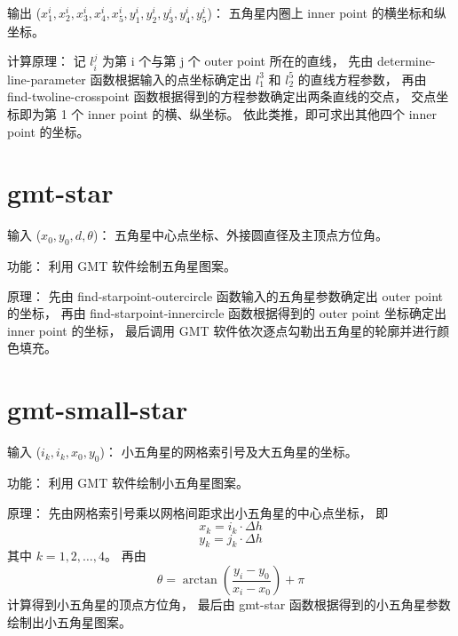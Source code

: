 \documentclass[UTF8]{ctexart}
\begin{document}
输出 ($x_1^i, x_2^i, x_3^i, x_4^i, x_5^i,
y_1^i, y_2^i, y_3^i, y_4^i, y_5^i$)：
五角星内圈上 inner point 的横坐标和纵坐标。

计算原理：
记 $l_i^j$ 为第 i 个与第 j 个 outer point 所在的直线，
先由 determine-line-parameter 函数根据输入的点坐标确定出 $l_1^3$ 和 $l_2^5$ 的直线方程参数，
再由 find-twoline-crosspoint 函数根据得到的方程参数确定出两条直线的交点，
交点坐标即为第 1 个 inner point 的横、纵坐标。
依此类推，即可求出其他四个 inner point 的坐标。

\section{gmt-star}
输入 ($x_0, y_0, d, \theta$)：
五角星中心点坐标、外接圆直径及主顶点方位角。

功能：
利用 GMT 软件绘制五角星图案。

原理：
先由 find-starpoint-outercircle 函数输入的五角星参数确定出 outer point 的坐标，
再由 find-starpoint-innercircle 函数根据得到的 outer point 坐标确定出 inner point 的坐标，
最后调用 GMT 软件依次逐点勾勒出五角星的轮廓并进行颜色填充。

\section{gmt-small-star}
输入 ($i_k, i_k, x_0, y_0$)：
小五角星的网格索引号及大五角星的坐标。

功能：
利用 GMT 软件绘制小五角星图案。

原理：
先由网格索引号乘以网格间距求出小五角星的中心点坐标，
即
\[ x_k = i_k \cdot \Delta h \]
\[ y_k = j_k \cdot \Delta h \]
其中 $k = 1, 2, \ldots, 4$。
再由
\[ \theta = \arctan \left( \frac{y_i - y_0}{x_i - x_0} \right) + \pi \]
计算得到小五角星的顶点方位角，
最后由 gmt-star 函数根据得到的小五角星参数绘制出小五角星图案。
\end{document}
